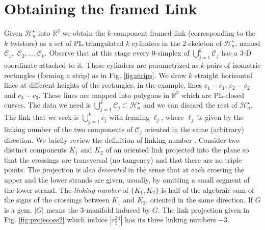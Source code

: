 



\section{Obtaining the framed Link}
Given $\mathcal{H}_{n}^\star$ into
$\mathbb{R}^3$ we obtain the $k$-component 
framed link (corresponding to the $k$ twistors) as a set of 
PL-triangulated $k$ cylinders in the 2-skeleton of 
$\mathcal{H}_{n}^\star$, named $\mathcal{C}_1,$ $\mathcal{C}_2, \ldots,\mathcal{C}_k$.
Observe that at this stage every 0-simplex of  $\bigcup_{j=1}^k \mathcal{C}_j$ 
has a 3-D coordinate attached to it. These cylinders are parametrized
as $k$ pairs of isometric rectangles (forming a strip) as in Fig. \ref{fig:strips}.
We draw $k$ straight horizontal lines at different heights of the rectangles, in the example,
lines $c_1-c_1$, $c_2-c_2$ and $c_3-c_3$. These lines are 
mapped into polygons in $\mathbb{R}^3$ which are PL-closed curves. 
The data we need is $\bigcup_{j=1}^k \mathcal{C}_j \subset \mathcal{H}_{n}^\star$
and we can discard the rest of $\mathcal{H}_{n}^\star$. The link that we seek 
is $\bigcup_{j=1}^k c_j$ with framing $\ell_j$, where $\ell_j$ is
given by the linking number of the two components of $\mathcal{C}_j$ oriented in
the same (arbitrary) direction.
We briefly review the definition of linking number 
\cite {lickorish1997introduction}.
Consider two distinct components $K_1$ and $K_2$ of an oriented link projected into
the plane so that the crossings are transversal 
(no tangency) and that there are no triple points. 
The projection is also {\em decorated}
in the sense that at each crossing the upper and 
the lower strands are given, usually,
by omitting a small segment of the lower strand.
 The  {\em linking number} of $\{K_1, K_2\}$
is half of the algebraic sum of the signs of the crossings 
between $K_1$ and $K_2$, oriented 
in the same direction. If $G$ is a gem, $|G|$ means
the 3-manifold induced by $G$.
The link projection given in Fig. \ref{fig:projecoes2} 
which induce $|r^{24}_5|$ has its three linking numbers $-3$.






